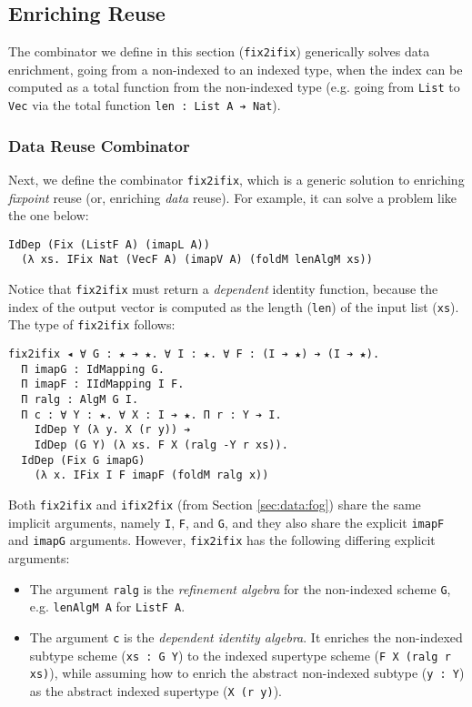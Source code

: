 \documentclass[acmsmall]{acmart}\settopmatter{}
\newcommand{\refsec}[1]{Section \ref{sec:#1}}
\newcommand{\labsec}[1]{\label{sec:#1}}
\begin{document}
\subsection{Enriching Reuse}
\labsec{data:enr}

The combinator we define in this section
(\verb;fix2ifix;) generically solves data enrichment, going from a
non-indexed to an indexed type, when the index can be
computed as a total function from the non-indexed type
(e.g. going from \verb;List; to \verb;Vec; via the total function
\verb;len : List A ➔ Nat;).

\subsubsection{Data Reuse Combinator}

Next, we define the combinator \verb;fix2ifix;, which
is a generic solution
to enriching \textit{fixpoint} reuse
(or, enriching \textit{data} reuse).
For example, it can solve a problem like the one below:

\begin{verbatim}
IdDep (Fix (ListF A) (imapL A))
  (λ xs. IFix Nat (VecF A) (imapV A) (foldM lenAlgM xs))
\end{verbatim}
Notice that \verb;fix2ifix; must return a \textit{dependent} identity
function, because the index of the output vector is computed as the
length (\verb;len;) of the input list (\verb;xs;).
The type of \verb;fix2ifix; follows:

\begin{verbatim}
fix2ifix ◂ ∀ G : ★ ➔ ★. ∀ I : ★. ∀ F : (I ➔ ★) ➔ (I ➔ ★).
  Π imapG : IdMapping G.
  Π imapF : IIdMapping I F. 
  Π ralg : AlgM G I. 
  Π c : ∀ Y : ★. ∀ X : I ➔ ★. Π r : Y ➔ I. 
    IdDep Y (λ y. X (r y)) ➔ 
    IdDep (G Y) (λ xs. F X (ralg -Y r xs)).
  IdDep (Fix G imapG) 
    (λ x. IFix I F imapF (foldM ralg x))
\end{verbatim}

Both \verb;fix2ifix; and \verb;ifix2fix; (from \refsec{data:fog})
share the same implicit arguments, namely \verb;I;, \verb;F;,
and \verb;G;, and they also share the explicit \verb;imapF; and
\verb;imapG; arguments. However, \verb;fix2ifix; has the following
differing explicit arguments:

\begin{itemize}
\item The argument \verb;ralg; is the
  \textit{refinement algebra} for the non-indexed scheme \verb;G;,
  e.g. \verb;lenAlgM A; for \verb;ListF A;.

\item The argument \verb;c; is the \textit{dependent identity algebra}. It
  enriches the non-indexed subtype scheme (\verb;xs : G Y;)
  to the indexed supertype scheme (\verb;F X (ralg r xs);),
  while assuming
  how to enrich the abstract non-indexed subtype (\verb;y : Y;) as
  the abstract indexed supertype (\verb;X (r y);).
\end{itemize}
\end{document}
